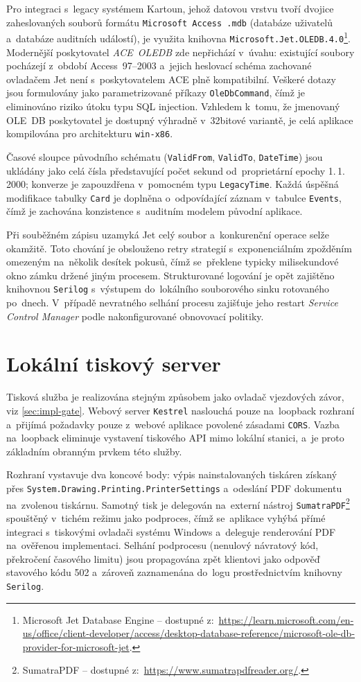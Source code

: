Pro integraci s~legacy systémem Kartoun, jehož datovou vrstvu tvoří dvojice zaheslovaných souborů formátu \texttt{Microsoft Access .mdb} (databáze uživatelů a~databáze auditních událostí), je využita knihovna \texttt{Microsoft.Jet.OLEDB.4.0}\footnote{Microsoft Jet Database Engine -- dostupné z:~\url{https://learn.microsoft.com/en-us/office/client-developer/access/desktop-database-reference/microsoft-ole-db-provider-for-microsoft-jet}.}.
Modernější poskytovatel \emph{ACE~OLEDB} zde nepřichází v~úvahu: existující soubory pocházejí z~období Access~97--2003 a~jejich heslovací schéma zachované ovladačem Jet není s~poskytovatelem ACE plně kompatibilní.
Veškeré dotazy jsou formulovány jako parametrizované příkazy \texttt{OleDbCommand}, čímž je eliminováno riziko útoku typu SQL injection.
Vzhledem k~tomu, že jmenovaný OLE~DB poskytovatel je dostupný výhradně v~32bitové variantě, je celá aplikace kompilována pro architekturu \texttt{win-x86}.

Časové sloupce původního schématu (\texttt{ValidFrom}, \texttt{ValidTo}, \texttt{DateTime}) jsou ukládány jako celá čísla představující počet sekund od~proprietární epochy 1.\,1.\,2000; konverze je zapouzdřena v~pomocném typu \texttt{LegacyTime}.
Každá úspěšná modifikace tabulky \texttt{Card} je doplněna o~odpovídající záznam v~tabulce \texttt{Events}, čímž je zachována konzistence s~auditním modelem původní aplikace.

Při souběžném zápisu uzamyká Jet celý soubor a~konkurenční operace selže okamžitě.
Toto chování je obslouženo retry strategií s~exponenciálním zpožděním omezeným na~několik desítek pokusů, čímž se~překlene typicky milisekundové okno zámku držené jiným procesem.
Strukturované logování je opět zajištěno knihovnou \texttt{Serilog} s~výstupem do~lokálního souborového sinku rotovaného po~dnech.
V~případě nevratného selhání procesu zajišťuje jeho restart \emph{Service Control Manager} podle nakonfigurované obnovovací politiky.

\section{Lokální tiskový server}
\label{sec:impl-print}
Tisková služba je realizována stejným způsobem jako ovladač vjezdových závor, viz \ref{sec:impl-gate}.
Webový server \texttt{Kestrel} naslouchá pouze na~loopback rozhraní a~přijímá požadavky pouze z~webové aplikace povolené zásadami \texttt{CORS}.
Vazba na~loopback eliminuje vystavení tiskového API mimo lokální stanici, a~je proto základním obranným prvkem této služby.

Rozhraní vystavuje dva koncové body: výpis nainstalovaných tiskáren získaný přes \texttt{System.Drawing.Printing.PrinterSettings} a~odeslání PDF dokumentu na~zvolenou tiskárnu.
Samotný tisk je delegován na~externí nástroj \texttt{SumatraPDF}\footnote{SumatraPDF -- dostupné z:~\url{https://www.sumatrapdfreader.org/}.} spouštěný v~tichém režimu jako podproces, čímž se~aplikace vyhýbá přímé integraci s~tiskovými ovladači systému Windows a~deleguje renderování PDF na~ověřenou implementaci.
Selhání podprocesu (nenulový návratový kód, překročení časového limitu) jsou propagována zpět klientovi jako odpověď stavového kódu 502 a~zároveň zaznamenána do~logu prostřednictvím knihovny \texttt{Serilog}.
